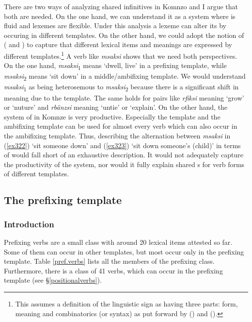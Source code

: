 There are two ways of analyzing shared infinitives in Komnzo and I argue that both are needed. On the one hand, we can understand it as a system where  is fluid and lexemes are flexible. Under this analysis a lexeme can alter its  by occuring in different templates. On the other hand, we could adopt the notion of  (\citealt{Lichtenberk:1991ic} and \citealt[524]{Evans:2012we}) to capture that different lexical items and meanings are expressed by different templates.\footnote{This assumes a definition of the linguistic sign as having three parts: form, meaning and combinatorics (or syntax) as put forward by (\citealt{Melcuk:1973vu}) and (\citealt[51]{Pollard:1987wu}).} A verb like \emph{msaksi} shows that we need both perspectives. On the one hand, \emph{msaksi}\textsubscript{1} means `dwell, live' in a prefixing template, while \emph{msaksi}\textsubscript{2} means `sit down' in a middle/ambifixing template. We would understand \emph{msaksi}\textsubscript{1} as being heterosemous to \emph{msaksi}\textsubscript{2} because there is a significant shift in meaning due to the template. The same holds for pairs like \emph{rfiksi} meaning `grow' or `nuture' and \emph{rbänzsi} meaning `untie' or `explain'. On the other hand, the system of  in Komnze is very productive. Especially the  template and the  ambifixing template can be used for almost every verb which can also occur in the  ambifixing template. Thus, describing the alternation between \emph{msaksi} in (\ref{ex322}) `sit someone down' and (\ref{ex323}) `sit down someone's (child)' in terms of  would fall short of an exhaustive description. It would not adequately capture the productivity of the system, nor would it fully explain shared s for verb forms of different templates.

\subsection{The prefixing template} \label{prefixingverbsec}

\subsubsection{Introduction}

Prefixing verbs are a small class with around 20 lexical items attested so far. Some of them can occur in other templates, but most occur only in the prefixing template. Table \ref{pref.verbs} lists all the members of the prefixing class. Furthermore, there is a class of 41  verbs, which can occur in the prefixing template (see \S{}\ref{positionalverbs}).

